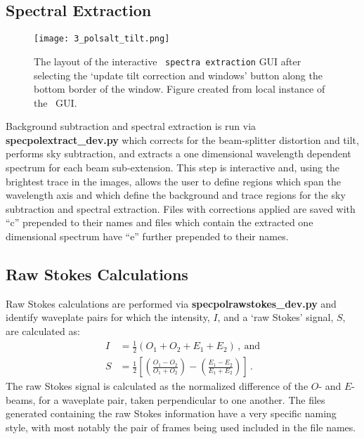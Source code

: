 \subsection{Spectral Extraction}

\begin{figure}[t]
    \centering
    \texttt{[image: 3\_polsalt\_tilt.png]}
    \caption{The layout of the interactive \polsalt\ \texttt{spectra extraction} \gls{GUI} after selecting the `update tilt correction and windows' button along the bottom border of the window. Figure created from local instance of the \polsalt\ \gls{GUI}.}
    \label{fig:polsalt_gui_spec}
\end{figure}

Background subtraction and spectral extraction is run via \textbf{spec\-pol\-extract\_dev.py} which corrects for the beam-splitter distortion and tilt, performs sky subtraction, and extracts a one dimensional wavelength dependent spectrum for each beam sub-extension. This step is interactive and, using the brightest trace in the images, allows the user to define regions which span the wavelength axis and which define the background and trace regions for the sky subtraction and spectral extraction. Files with corrections applied are saved with ``c'' prepended to their names and files which contain the extracted one dimensional spectrum have ``e'' further prepended to their names.

\subsection{Raw Stokes Calculations}

Raw Stokes calculations are performed via \textbf{specpolraw\-stokes\_dev.py} and identify waveplate pairs for which the intensity, $I$, and a `raw Stokes' signal, $S$, are calculated as:
\begin{align} \label{eq:polsalt_rawstokes}
    I &= \frac{1}{2} (O_{1} + O_{2} + E_{1} + E_{2})\,,\ \text{and}\\
    S &= \frac{1}{2} \left[ \left( \frac{O_{1} - O_{2}}{O_{1} + O_{2}} \right) - \left( \frac{E_{1} - E_{2}}{E_{1} + E_{2}} \right) \right]\,.
\end{align}
The raw Stokes signal is calculated as the normalized difference of the $O$- and $E$-beams, for a waveplate pair, taken perpendicular to one another. The files generated containing the raw Stokes information have a very specific naming style, with most notably the pair of frames being used included in the file names.

